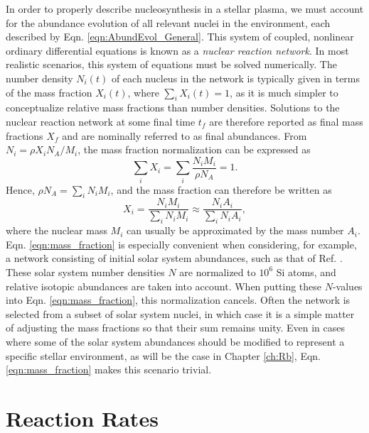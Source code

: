 In order to properly describe nucleosynthesis in a stellar plasma, we must account for the abundance evolution of all relevant nuclei in the environment, each described by Eqn. \ref{eqn:AbundEvol_General}. This system of coupled, nonlinear ordinary differential equations is known as a \emph{nuclear reaction network}. In most realistic scenarios, this system of equations must be solved numerically. The number density $N_{i}(t)$ of each nucleus in the network is typically given in terms of the mass fraction $X_{i}(t)$, where $\sum_{i} X_{i}(t) = 1$, as it is much simpler to conceptualize relative mass fractions than number densities. Solutions to the nuclear reaction network at some final time $t_{f}$ are therefore reported as final mass fractions $X_{f}$ and are nominally referred to as final abundances. From $N_{i} = \rho X_{i} N_{A} / M_{i}$, the mass fraction normalization can be expressed as
\begin{equation}
\sum_{i} X_{i} = \sum_{i} \frac{N_{i}M_{i}}{\rho N_{A}} = 1.
\end{equation}
Hence, $\rho N_{A} = \sum_{i} N_{i}M_{i}$, and the mass fraction can therefore be written as
\begin{equation} \label{eqn:mass_fraction}
X_{i} = \frac{N_{i}M_{i}}{\sum_{i} N_{i}M_{i}} \approx \frac{N_{i}A_{i}}{\sum_{i} N_{i}A_{i}},
\end{equation}
where the nuclear mass $M_{i}$ can usually be approximated by the mass number $A_{i}$. Eqn. \ref{eqn:mass_fraction} is especially convenient when considering, for example, a network consisting of initial solar system abundances, such as that of Ref. \cite{Lodders2009}. These solar system number densities $N$ are normalized to $10^{6}$ Si atoms, and relative isotopic abundances are taken into account. When putting these $N$-values into Eqn. \ref{eqn:mass_fraction}, this normalization cancels. Often the network is selected from a subset of solar system nuclei, in which case it is a simple matter of adjusting the mass fractions so that their sum remains unity. Even in cases where some of the solar system abundances should be modified to represent a specific stellar environment, as will be the case in Chapter \ref{ch:Rb}, Eqn. \ref{eqn:mass_fraction} makes this scenario trivial.


\section{Reaction Rates} \label{sec:rates}

